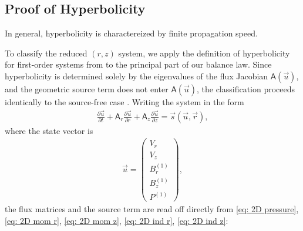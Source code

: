 \subsection{Proof of Hyperbolicity}
\label{subsec: types of PDEs}

In general, hyperbolicity is charactereized by finite propagation speed.

To classify the reduced $(r,z)$ system, we apply the definition of hyperbolicity
for first-order systems from \cite{godlewski2021} to the principal part of our
balance law. Since hyperbolicity is determined solely by the eigenvalues of the
flux Jacobian $\mathsf{A}(\vec{u})$, and the
geometric source term does not enter $\mathsf{A}(\vec{u})$, the classification proceeds
identically to the source-free case \cite[Ch.~VII, \S1.1]{godlewski2021}.
Writing the system in the form
\begin{align}
    \frac{\partial \vec{u}}{\partial t}
        + \mathsf{A}_r \frac{\partial \vec{u}}{\partial r}
        + \mathsf{A}_z \frac{\partial \vec{u}}{\partial z} = \vec{s}(\vec{u}, \vec{r}),
    \label{eq: matrix system}
\end{align}
where the state vector is
\begin{align}
    \vec{u} = \begin{pmatrix} V_r \\ V_z \\ B_r^{(1)} \\ B_z^{(1)} \\ P^{(1)}
    \end{pmatrix},
\end{align}
the flux matrices and the source term are read off directly from 
\eqref{eq: 2D pressure}, \eqref{eq: 2D mom r}, \eqref{eq: 2D mom z},
\eqref{eq: 2D ind r}, \eqref{eq: 2D ind z}:
